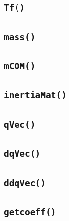 \documentclass[a4paper,10pt]{article}
\begin{document}
\subsection{\texttt{Tf()}}

 
\subsection{\texttt{mass()}}

 
\subsection{\texttt{mCOM()}}

 
\subsection{\texttt{inertiaMat()}}

 
\subsection{\texttt{qVec()}}

 
\subsection{\texttt{dqVec()}}

 
\subsection{\texttt{ddqVec()}}

 
\subsection{\texttt{getcoeff()}}


% 
\end{document}
